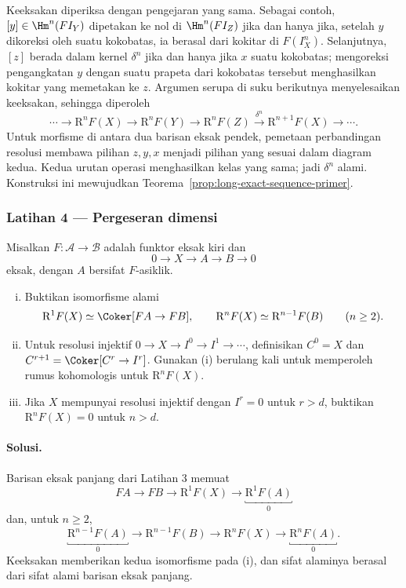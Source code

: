 Keeksakan diperiksa dengan pengejaran yang sama. Sebagai contoh,
$[y]\in\Hm^n(FI_Y)$ dipetakan ke nol di $\Hm^n(FI_Z)$ jika dan hanya jika,
setelah $y$ dikoreksi oleh suatu kokobatas, ia berasal dari kokitar di
$F(I_X^n)$. Selanjutnya, $[z]$ berada dalam kernel $\delta^n$ jika dan hanya
jika $x$ suatu kokobatas; mengoreksi pengangkatan $y$ dengan suatu prapeta dari
kokobatas tersebut menghasilkan kokitar yang memetakan ke $z$. Argumen
serupa di suku berikutnya menyelesaikan keeksakan, sehingga diperoleh
\[
	\cdots\to\mathrm{R}^nF(X)\to\mathrm{R}^nF(Y)
	\to\mathrm{R}^nF(Z)\xrightarrow{\delta^n}
	\mathrm{R}^{n+1}F(X)\to\cdots.
\]
Untuk morfisme di antara dua barisan eksak pendek, pemetaan perbandingan
resolusi membawa pilihan $z,y,x$ menjadi pilihan yang sesuai dalam diagram kedua.
Kedua urutan operasi menghasilkan kelas yang sama; jadi $\delta^n$ alami.
Konstruksi ini mewujudkan Teorema~\ref{prop:long-exact-sequence-primer}.

\subsubsection*{Latihan 4 --- Pergeseran dimensi}
\hypertarget{o014.mastery.derived-spectral.002.ex04}{ }
\label{mastery:derived-spectral-002-ex04}

Misalkan $F:\mathcal{A}\to\mathcal{B}$ adalah funktor eksak kiri dan
\[
	0\longrightarrow X\longrightarrow A\longrightarrow B\longrightarrow0
\]
eksak, dengan $A$ bersifat $F$-asiklik.
\begin{enumerate}[(i)]
	\item Buktikan isomorfisme alami
	\[
		\mathrm{R}^1F(X)\simeq\Coker[FA\to FB],
		\qquad
		\mathrm{R}^nF(X)\simeq\mathrm{R}^{n-1}F(B)\qquad(n\geq2).
	\]
	\item Untuk resolusi injektif
	$0\to X\to I^0\to I^1\to\cdots$, definisikan
	$C^0=X$ dan $C^{r+1}=\Coker[C^r\to I^r]$. Gunakan (i) berulang kali
	untuk memperoleh rumus kohomologis untuk $\mathrm{R}^nF(X)$.
	\item Jika $X$ mempunyai resolusi injektif dengan $I^r=0$ untuk $r>d$,
	buktikan $\mathrm{R}^nF(X)=0$ untuk $n>d$.
\end{enumerate}

\paragraph{Solusi.}
\hypertarget{o014.mastery.derived-spectral.002.sol04}{ }
Barisan eksak panjang dari Latihan 3 memuat
\[
	FA\longrightarrow FB\longrightarrow\mathrm{R}^1F(X)
	\longrightarrow\underbracket{\mathrm{R}^1F(A)}_{0}
\]
dan, untuk $n\geq2$,
\[
	\underbracket{\mathrm{R}^{n-1}F(A)}_{0}
	\longrightarrow\mathrm{R}^{n-1}F(B)
	\longrightarrow\mathrm{R}^nF(X)
	\longrightarrow\underbracket{\mathrm{R}^nF(A)}_{0}.
\]
Keeksakan memberikan kedua isomorfisme pada (i), dan sifat alaminya berasal
dari sifat alami barisan eksak panjang.

